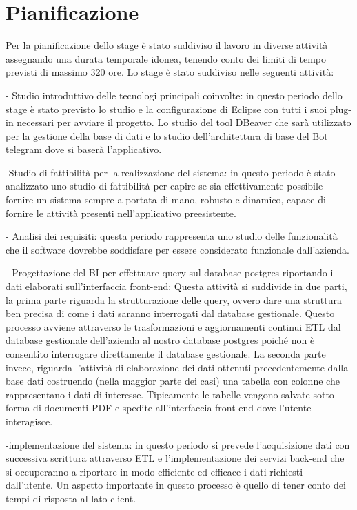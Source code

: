 \section{Pianificazione}

Per la pianificazione dello stage è stato suddiviso il lavoro in diverse attività assegnando una durata temporale idonea, tenendo conto dei limiti di tempo previsti di massimo 320 ore. Lo stage è stato suddiviso nelle seguenti attività:

- Studio introduttivo delle tecnologi principali coinvolte: in questo periodo dello stage è stato previsto lo studio e la configurazione di Eclipse con tutti i suoi plug-in necessari per avviare il progetto. Lo studio del tool DBeaver che sarà utilizzato per la gestione della base di dati e lo studio dell’architettura di base del Bot telegram dove si baserà l’applicativo.

-Studio di fattibilità per la realizzazione del sistema: in questo periodo è stato analizzato uno studio di fattibilità per capire se sia effettivamente possibile fornire un sistema sempre a portata di mano, robusto e dinamico, capace di fornire le attività  presenti nell’applicativo preesistente.

- Analisi dei requisiti: questa periodo rappresenta uno studio delle funzionalità che il software dovrebbe soddisfare per essere considerato funzionale dall’azienda. 

- Progettazione del BI per effettuare query sul database postgres riportando i dati elaborati sull’interfaccia front-end:
Questa attività si suddivide in due parti, la prima parte riguarda la strutturazione delle query, ovvero dare una struttura ben precisa di come i dati saranno interrogati dal database gestionale. Questo processo avviene attraverso le trasformazioni e aggiornamenti continui ETL dal database gestionale dell’azienda al nostro database postgres poiché non è consentito interrogare direttamente il database gestionale. 
La seconda parte invece, riguarda l’attività di elaborazione dei dati ottenuti precedentemente dalla base dati costruendo (nella maggior parte dei casi) una tabella con colonne che rappresentano i dati di interesse. Tipicamente le tabelle vengono salvate sotto forma di documenti PDF e spedite all’interfaccia front-end dove l’utente interagisce. 

-implementazione del sistema: in questo periodo si prevede l’acquisizione dati con successiva scrittura attraverso ETL e l’implementazione dei servizi back-end che si occuperanno a riportare in modo efficiente ed efficace i dati richiesti dall’utente. Un aspetto importante in questo processo è quello di tener conto dei tempi di risposta al lato client.

